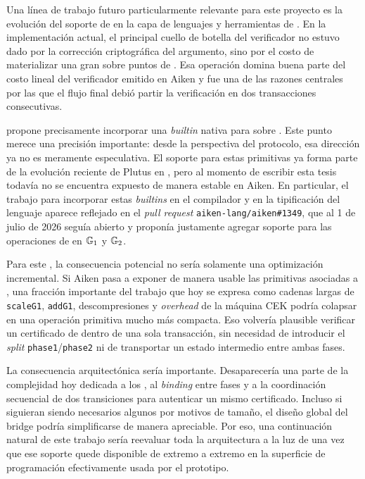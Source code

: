 Una línea de trabajo futuro particularmente relevante para este proyecto es la evolución del soporte de \MSM en la capa de lenguajes y herramientas de \Cardano. En la implementación actual, el principal cuello de botella del verificador \STM no estuvo dado por la corrección criptográfica del argumento, sino por el costo de materializar \Onchain una gran \MSM sobre puntos de \BLS. Esa operación domina buena parte del costo lineal del verificador emitido en Aiken y fue una de las razones centrales por las que el flujo final debió partir la verificación en dos transacciones consecutivas.

 propone precisamente incorporar una \textit{builtin} nativa para \MSM sobre \BLS \cite{CIP0133, PlutusMSMBenchRepo}. Este punto merece una precisión importante: desde la perspectiva del protocolo, esa dirección ya no es meramente especulativa. El soporte para estas primitivas ya forma parte de la evolución reciente de Plutus en \Cardano, pero al momento de escribir esta tesis todavía no se encuentra expuesto de manera estable en Aiken. En particular, el trabajo para incorporar estas \textit{builtins} en el compilador y en la tipificación del lenguaje aparece reflejado en el \textit{pull request} \texttt{aiken-lang/aiken\#1349}, que al 1 de julio de 2026 seguía abierto y proponía justamente agregar soporte para las operaciones de \MSM en $\mathbb{G}_1$ y $\mathbb{G}_2$.

Para este \zkBridge, la consecuencia potencial no sería solamente una optimización incremental. Si Aiken pasa a exponer de manera usable las primitivas asociadas a , una fracción importante del trabajo que hoy se expresa como cadenas largas de \texttt{scaleG1}, \texttt{addG1}, descompresiones y \textit{overhead} de la máquina CEK podría colapsar en una operación primitiva mucho más compacta. Eso volvería plausible verificar un certificado de \Mithril dentro de una sola transacción, sin necesidad de introducir el \textit{split} \texttt{phase1}/\texttt{phase2} ni de transportar un estado intermedio entre ambas fases.

La consecuencia arquitectónica sería importante. Desaparecería una parte de la complejidad hoy dedicada a los \ProofReceipt, al \textit{binding} entre fases y a la coordinación secuencial de dos transiciones para autenticar un mismo certificado. Incluso si siguieran siendo necesarios algunos \ReferenceScripts por motivos de tamaño, el diseño global del bridge podría simplificarse de manera apreciable. Por eso, una continuación natural de este trabajo sería reevaluar toda la arquitectura a la luz de  una vez que ese soporte quede disponible de extremo a extremo en la superficie de programación efectivamente usada por el prototipo.

